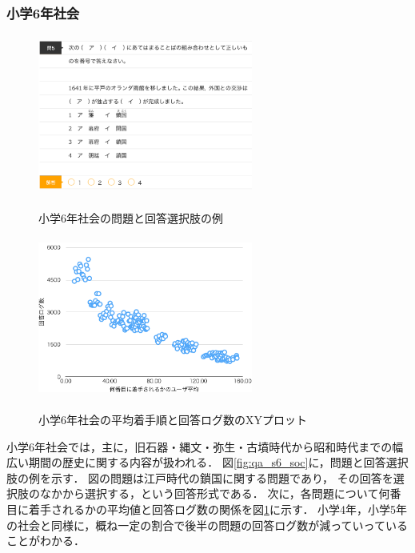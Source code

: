 \subsubsection{小学6年社会}
\begin{figure}[ht]
\begin{center}
	\includegraphics[width=200pt, height=150pt]{./img/qa_s6_soc.png}
	\caption{小学6年社会の問題と回答選択肢の例}
	\label{fig:qa_s6_soc}
\endminipage\hfill
{}
	\includegraphics[width=200pt, height=150pt]{./img/stats_s6_soc.pdf}
	\caption{小学6年社会の平均着手順と回答ログ数のXYプロット}
	\label{fig:stats_s6_soc}
\endminipage\hfill
\end{center}
\end{figure}
小学6年社会では，主に，旧石器・縄文・弥生・古墳時代から昭和時代までの幅広い期間の歴史に関する内容が扱われる．
図\ref{fig:qa_s6_soc}に，問題と回答選択肢の例を示す．
図の問題は江戸時代の鎖国に関する問題であり，
その回答を選択肢のなかから選択する，という回答形式である．
次に，各問題について何番目に着手されるかの平均値と回答ログ数の関係を図\ref{fig:stats_s6_soc}に示す．
小学4年，小学5年の社会と同様に，概ね一定の割合で後半の問題の回答ログ数が減っていっていることがわかる．



